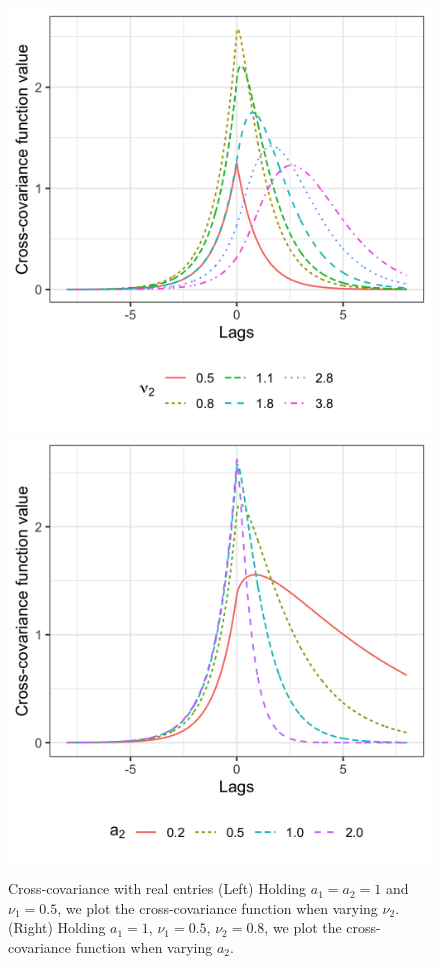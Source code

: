 \documentclass[11pt]{article}
\begin{document}
\begin{figure}
\centering
\includegraphics[scale = .16]{../example_fun_whittaker.png}
\includegraphics[scale = .16]{../example_fun_whittaker_scale.png}
\caption{Cross-covariance with real entries (Left) Holding $a_1 = a_2 = 1$ and $\nu_1= 0.5$, we plot the cross-covariance function when varying $\nu_2$. (Right) Holding $a_1 = 1$, $\nu_1= 0.5$, $\nu_2 = 0.8$, we plot the cross-covariance function when varying $a_2$.}\label{fig:type_pos}
\end{figure}
\end{document}
